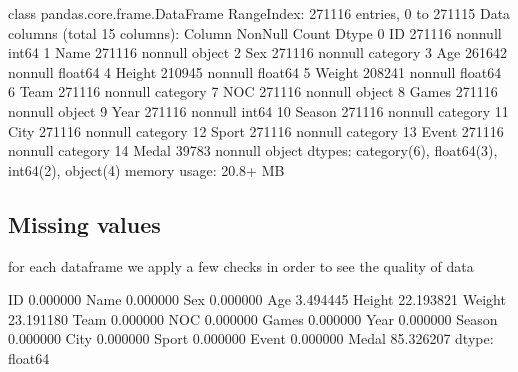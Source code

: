 \documentclass[letterpaper,10pt,english]{jupyterBook}
\begin{document}
\begin{sphinxVerbatim}[commandchars=\\\{\}]
\PYGZlt{}class \PYGZsq{}pandas.core.frame.DataFrame\PYGZsq{}\PYGZgt{}
RangeIndex: 271116 entries, 0 to 271115
Data columns (total 15 columns):
 \PYGZsh{}   Column  Non\PYGZhy{}Null Count   Dtype   
\PYGZhy{}\PYGZhy{}\PYGZhy{}  \PYGZhy{}\PYGZhy{}\PYGZhy{}\PYGZhy{}\PYGZhy{}\PYGZhy{}  \PYGZhy{}\PYGZhy{}\PYGZhy{}\PYGZhy{}\PYGZhy{}\PYGZhy{}\PYGZhy{}\PYGZhy{}\PYGZhy{}\PYGZhy{}\PYGZhy{}\PYGZhy{}\PYGZhy{}\PYGZhy{}   \PYGZhy{}\PYGZhy{}\PYGZhy{}\PYGZhy{}\PYGZhy{}   
 0   ID      271116 non\PYGZhy{}null  int64   
 1   Name    271116 non\PYGZhy{}null  object  
 2   Sex     271116 non\PYGZhy{}null  category
 3   Age     261642 non\PYGZhy{}null  float64 
 4   Height  210945 non\PYGZhy{}null  float64 
 5   Weight  208241 non\PYGZhy{}null  float64 
 6   Team    271116 non\PYGZhy{}null  category
 7   NOC     271116 non\PYGZhy{}null  object  
 8   Games   271116 non\PYGZhy{}null  object  
 9   Year    271116 non\PYGZhy{}null  int64   
 10  Season  271116 non\PYGZhy{}null  category
 11  City    271116 non\PYGZhy{}null  category
 12  Sport   271116 non\PYGZhy{}null  category
 13  Event   271116 non\PYGZhy{}null  category
 14  Medal   39783 non\PYGZhy{}null   object  
dtypes: category(6), float64(3), int64(2), object(4)
memory usage: 20.8+ MB
\end{sphinxVerbatim}


\subsection{Missing values}
\label{\detokenize{c7_case_studies/Olympics:missing-values}}
\sphinxAtStartPar
for each dataframe we apply a few checks in order to see the quality of data

\begin{sphinxVerbatim}[commandchars=\\\{\}]
\PYG{p}{[}\PYG{p}{]}
\end{sphinxVerbatim}

\begin{sphinxVerbatim}[commandchars=\\\{\}]
ID         0.000000
Name       0.000000
Sex        0.000000
Age        3.494445
Height    22.193821
Weight    23.191180
Team       0.000000
NOC        0.000000
Games      0.000000
Year       0.000000
Season     0.000000
City       0.000000
Sport      0.000000
Event      0.000000
Medal     85.326207
dtype: float64
\end{sphinxVerbatim}
\end{document}
